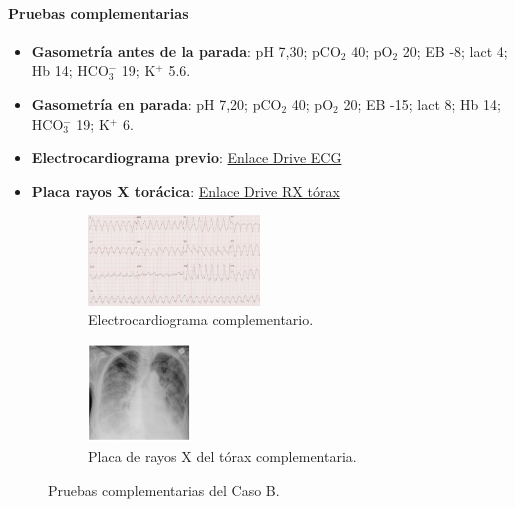 \paragraph{Pruebas complementarias}
\begin{itemize}[topsep=0pt, partopsep=0pt,itemsep=0pt,parsep=0pt]
    \item \textbf{Gasometría antes de la parada}: pH 7,30; pCO$_2$ 40; pO$_2$ 20; EB -8; lact 4; Hb 14; HCO$_3^-$ 19; K$^+$ 5.6.
    \item \textbf{Gasometría en parada}: pH 7,20; pCO$_2$ 40; pO$_2$ 20; EB -15; lact 8; Hb 14; HCO$_3^-$ 19; K$^+$ 6.
    \item \textbf{Electrocardiograma previo}: \href{https://drive.google.com/file/d/1GBe9Wofw9bwhYcRkuK_dNy-t5fBXRC2E/view?usp=share\_link}{Enlace Drive ECG}
    \item \textbf{Placa rayos X torácica}: \href{https://drive.google.com/file/d/13VFzIBswwJGnbaB4wLQZWEIJGqibEyjh/view?usp=share\_link}{Enlace Drive RX tórax}
\end{itemize}
\begin{figure}[hptb]
    \centering
    \begin{subfigure}{.5\textwidth}
      \centering
      \includegraphics[width=0.5\textwidth]{./imagenes/UCIDoc-SVICasoBECG.png}
      \caption{\label{fig:Brusilov:SVI:CasoBECG}Electrocardiograma complementario.}
    \end{subfigure}%
    \begin{subfigure}{.5\textwidth}
      \centering
      \includegraphics[width=0.3\textwidth]{./imagenes/UCIDoc-SVICasoARXTorax.png}
      \caption{\label{fig:Brusilov:SVI:CasoARXTorax}Placa de rayos X del tórax complementaria.}
    \end{subfigure}
    \caption{\label{fig:Brusilov:SVI:CasoB}Pruebas complementarias del Caso B.}
\end{figure}

